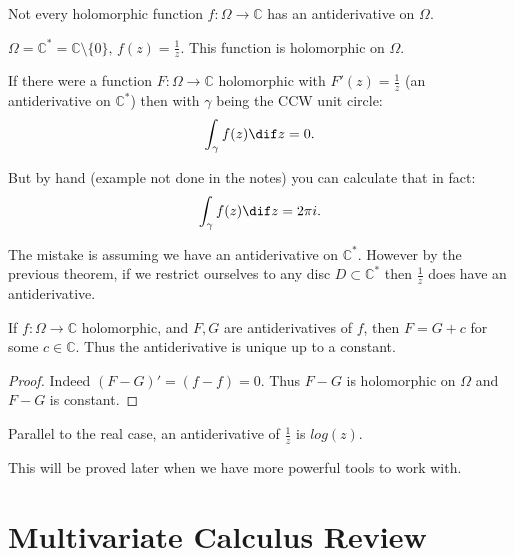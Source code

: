 \begin{remark}
Not every holomorphic function $f:\Omega \rightarrow \mathbb{C}$ has an antiderivative on $\Omega$.
\end{remark}


\begin{counterexample}

$\Omega = \mathbb{C}^* = \mathbb{C} \setminus \{0\}, \, f(z)=\frac{1}{z}$. This function is holomorphic on $\Omega$. 

If there were a function $F:\Omega\rightarrow\mathbb{C}$ holomorphic with $F'(z) = \frac{1}{z}$ (an antiderivative on $\mathbb{C}^*$) then with $\gamma$ being the CCW unit circle:
\begin{align*}
    \int_\gamma f(z) \dif z = 0.
\end{align*}

But by hand (example not done in the notes) you can calculate that in fact:
\begin{align*}
    \int_\gamma f(z) \dif z = 2\pi i.
\end{align*}

The mistake is assuming we have an antiderivative on $\mathbb{C}^*$. However by the previous theorem, if we restrict ourselves to any disc $D \subset \mathbb{C}^*$ then $\frac{1}{z}$ does have an antiderivative.

\end{counterexample}

\begin{remark}
If $f:\Omega \rightarrow \mathbb{C}$ holomorphic, and $F,G$ are antiderivatives of $f$, then $F=G+c $ for some $c\in \mathbb{C}$. Thus the antiderivative is unique up to a constant.
\end{remark}

\begin{proof}
Indeed $(F-G)'= (f-f) = 0$. Thus $F-G$ is holomorphic on $\Omega$ and $F-G$ is constant.
\end{proof}

\begin{remark}
Parallel to the real case, an antiderivative of $\frac{1}{z}$ is $log(z)$.
\end{remark}

This will be proved later when we have more powerful tools to work with.

\section{Multivariate Calculus Review}



